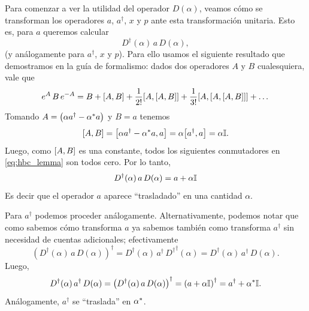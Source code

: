 \documentclass[10pt, a4paper]{article}
\numberwithin{equation}{subsection}
\begin{document}
\bigbreak

Para comenzar a ver la utilidad del operador $D(\alpha)$, veamos cómo se
transforman los operadores $a$, $a^\dagger$, $x$ y $p$ ante esta transformación
unitaria. Esto es, para $a$ queremos calcular
\begin{equation}
  D^\dagger(\alpha)\,a\,D(\alpha),
\end{equation}
(y análogamente para $a^\dagger$, $x$ y $p$). Para ello usamos el siguiente
resultado que demostramos en la guía de formalismo: dados dos operadores $A$ y
$B$ cualesquiera, vale que
\begin{equation} \label{eq:hbc_lemma}
  e^A\,B\,e^{-A} = B + \comm{A}{B} + \frac{1}{2!}\comm{A}{\comm{A}{B}} +
  \frac{1}{3!}\comm{A}{\comm{A}{\comm{A}{B}}} + \dots
\end{equation}
Tomando $A = \left(\alpha a^\dagger - {{\alpha}^{*}}a\right)$ y $B = a$ tenemos
\begin{equation}
  \comm{A}{B} = \comm{\alpha a^\dagger - \conj{\alpha}a}{a} =
    \alpha\comm{a^\dagger}{a} = \alpha\Id.
\end{equation}
Luego, como $\comm{A}{B}$ es una constante, todos los siguientes conmutadores
en \eqref{eq:hbc_lemma} son todos cero. Por lo tanto,
\begin{equation} \label{eq:a_D_transf}
  D^\dagger(\alpha)\,a\,D(\alpha) = a + \alpha\mathbb{I}
\end{equation}
Es decir que el operador $a$ aparece ``trasladado'' en una cantidad $\alpha$.

Para $a^\dagger$ podemos proceder análogamente. Alternativamente, podemos notar
que como sabemos cómo transforma $a$ ya sabemos también como transforma
$a^\dagger$ sin necesidad de cuentas adicionales; efectivamente
\begin{equation}
  \left(D^\dagger(\alpha)\,a\,D(\alpha)\right)^\dagger = 
  D^\dagger(\alpha)\,a^\dagger\,{D^\dagger}^\dagger(\alpha) =
  D^\dagger(\alpha)\,a^\dagger\,D(\alpha).
\end{equation}
Luego,
\begin{equation} \label{eq:adagger_D_transf}
  D^\dagger(\alpha)\,a^\dagger\,D(\alpha) = 
  \left(D^\dagger(\alpha)\,a\,D(\alpha)\right)^\dagger = 
  \left(a + \alpha\mathbb{I}\right)^\dagger = a^\dagger + {{\alpha}^{*}}\mathbb{I}.
\end{equation}
Análogamente, $a^\dagger$ se ``traslada'' en ${{\alpha}^{*}}$.
\end{document}
